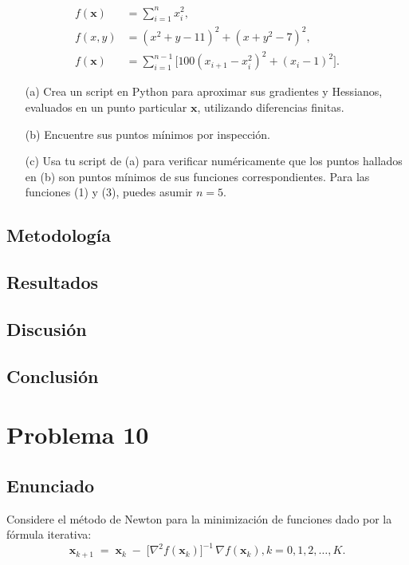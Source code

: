 \documentclass{article}
\begin{document}
\begin{align}
f(\mathbf{x}) &= \sum_{i=1}^{n} x_i^{2}, \label{eq:1}\\
f(x,y) &= (x^{2}+y-11)^{2} + (x+y^{2}-7)^{2}, \label{eq:2}\\
f(\mathbf{x}) &= \sum_{i=1}^{n-1} \bigl[100(x_{i+1}-x_i^{2})^{2} + (x_i-1)^{2}\bigr]. \label{eq:3}
\end{align}

\begin{enumerate}
  \item[(a)] Crea un script en Python para aproximar sus gradientes y Hessianos, evaluados en un punto particular $\mathbf{x}$, utilizando diferencias finitas.
  \item[(b)] Encuentre sus puntos mínimos por inspección.
  \item[(c)] Usa tu script de (a) para verificar numéricamente que los puntos hallados en (b) son puntos mínimos de sus funciones correspondientes. Para las funciones (1) y (3), puedes asumir $n=5$.
\end{enumerate}

\subsection{Metodología}

\subsection{Resultados}
\setcounter{equation}{0}

\subsection{Discusión}

\subsection{Conclusión}

\section{Problema 10}

\subsection{Enunciado}
Considere el método de Newton para la minimización de funciones dado por la fórmula iterativa:
\begin{equation*}
    \mathbf{x}_{k+1} \;=\; \mathbf{x}_{k} \;-\; \bigl[\nabla^{2} f(\mathbf{x}_{k})\bigr]^{-1}\,\nabla f(\mathbf{x}_{k}), k=0,1,2,\dots,K.
\end{equation*}
\end{document}
